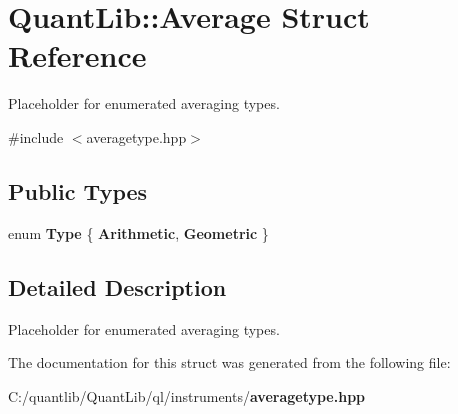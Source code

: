 \section{Quant\+Lib\+:\+:Average Struct Reference}
\label{struct_quant_lib_1_1_average}


Placeholder for enumerated averaging types.  




{\ttfamily \#include $<$averagetype.\+hpp$>$}

\subsection*{Public Types}
\begin{DoxyCompactItemize}
\item 
enum {\bfseries Type} \{ {\bfseries Arithmetic}, 
{\bfseries Geometric}
 \}\label{struct_quant_lib_1_1_average_adc4d7155dc36d6a830b0884a87b4f02a}

\end{DoxyCompactItemize}


\subsection{Detailed Description}
Placeholder for enumerated averaging types. 

The documentation for this struct was generated from the following file\+:\begin{DoxyCompactItemize}
\item 
C\+:/quantlib/\+Quant\+Lib/ql/instruments/{\bf averagetype.\+hpp}\end{DoxyCompactItemize}
